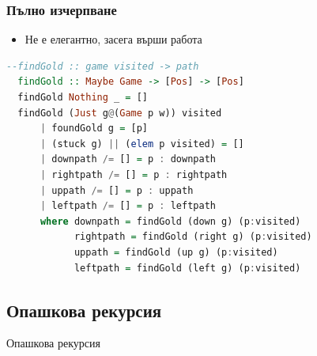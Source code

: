 \documentclass{beamer}
\begin{document}
\begin{frame}[fragile]
  \frametitle{Пълно изчерпване}


     
\begin{itemize}
  \item Не е елегантно, засега върши работа
\end{itemize}

\begin{lstlisting}[basicstyle=\small,language=Haskell]
  --findGold :: game visited -> path
  findGold :: Maybe Game -> [Pos] -> [Pos]
  findGold Nothing _ = []
  findGold (Just g@(Game p w)) visited
      | foundGold g = [p]
      | (stuck g) || (elem p visited) = []
      | downpath /= [] = p : downpath
      | rightpath /= [] = p : rightpath
      | uppath /= [] = p : uppath
      | leftpath /= [] = p : leftpath
      where downpath = findGold (down g) (p:visited)
            rightpath = findGold (right g) (p:visited)
            uppath = findGold (up g) (p:visited)
            leftpath = findGold (left g) (p:visited)  
\end{lstlisting}
  

\end{frame}

\subsection{Опашкова рекурсия}

\begin{frame}
  \centerline{Опашкова рекурсия}
\end{frame}
\end{document}
